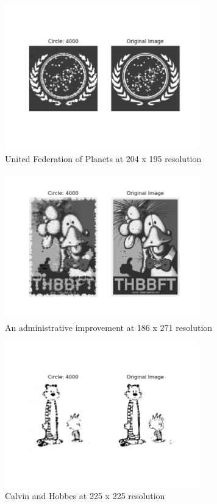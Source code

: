 \documentclass[12pt]{article}
\begin{document}
\begin{figure}[H]
\centering
\noindent\includegraphics[width=0.75\textwidth]{../results/ufop/ufop_4000}
\caption{United Federation of Planets at 204 x 195 resolution}
\end{figure}

\begin{figure}[H]
\centering
\noindent\includegraphics[width=0.75\textwidth]{../results/bill/bill_4000}
\caption{An administrative improvement at 186 x 271 resolution}
\end{figure}

\begin{figure}[H]
\centering
\noindent\includegraphics[width=0.75\textwidth]{../results/calvin_hobbes/calvin_hobbes_4000}
\caption{Calvin and Hobbes at 225 x 225 resolution}
\end{figure}
\end{document}

